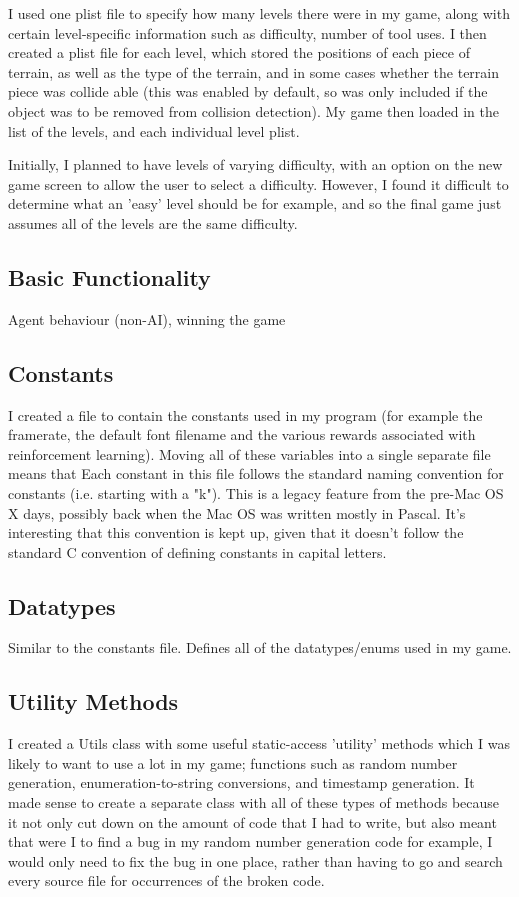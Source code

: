 \documentclass[a4paper,oneside]{report}
\begin{document}
I used one plist file to specify how many levels there were in my game, along with certain level-specific information such as difficulty, number of tool uses. I then created a plist file for each level, which stored the positions of each piece of terrain, as well as the type of the terrain, and in some cases whether the terrain piece was collide able (this was enabled by default, so was only included if the object was to be removed from collision detection). My game then loaded in the list of the levels, and each individual level plist. 

Initially, I planned to have levels of varying difficulty, with an option on the new game screen to allow the user to select a difficulty. However, I found it difficult to determine what an 'easy' level should be for example, and so the final game just assumes all of the levels are the same difficulty.

\subsection{Basic Functionality} Agent behaviour (non-AI), winning the game

\subsection{Constants} I created a file to contain the constants used in my program (for example the framerate, the default font filename and the various rewards associated with reinforcement learning). Moving all of these variables into a single separate file means that Each constant in this file follows the standard naming convention for constants (i.e. starting with a "k"). This is a legacy feature from the pre-Mac OS X days, possibly back when the Mac OS was written mostly in Pascal. It's interesting that this convention is kept up, given that it doesn't follow the standard C convention of defining constants in capital letters. 

\subsection{Datatypes} Similar to the constants file. Defines all of the datatypes/enums used in my game.

\subsection{Utility Methods} I created a Utils class with some useful static-access 'utility' methods which I was likely to want to use a lot in my game; functions such as random number generation, enumeration-to-string conversions, and timestamp generation. It made sense to create a separate class with all of these types of methods because it not only cut down on the amount of code that I had to write, but also meant that were I to find a bug in my random number generation code for example, I would only need to fix the bug in one place, rather than having to go and search every source file for occurrences of the broken code. 
		
\end{document}
